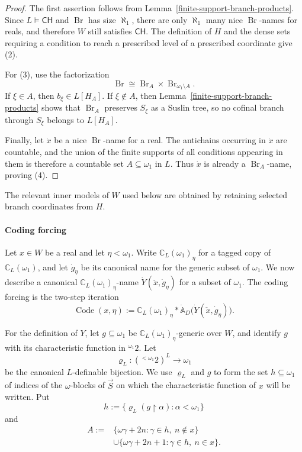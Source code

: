 \documentclass[a4paper,11pt]{article}
\newcommand{\CH}{\mathsf{CH}}
\begin{document}
\begin{proof}
The first assertion follows from Lemma~\ref{finite-support-branch-products}.
Since $L\models\CH$ and $\operatorname{Br}$ has size $\aleph_1$, there are only
$\aleph_1$ many nice $\operatorname{Br}$-names for reals, and therefore $W$
still satisfies $\CH$.  The definition of $H$ and the dense sets requiring a
condition to reach a prescribed level of a prescribed coordinate give (2).

For (3), use the factorization
\[
   \operatorname{Br}\cong
   \operatorname{Br}_A\times\operatorname{Br}_{\omega_1\setminus A}.
\]
If $\xi\in A$, then $b_\xi\in L[H_A]$.  If $\xi\notin A$, then
Lemma~\ref{finite-support-branch-products} shows that
$\operatorname{Br}_A$ preserves $S_\xi$ as a Suslin tree, so no cofinal branch
through $S_\xi$ belongs to $L[H_A]$.

Finally, let $\dot x$ be a nice $\operatorname{Br}$-name for a real.  The
antichains occurring in $\dot x$ are countable, and the union of the finite
supports of all conditions appearing in them is therefore a countable set
$A\subseteq\omega_1$ in $L$.  Thus $\dot x$ is already a
$\operatorname{Br}_A$-name, proving (4).
\end{proof}

The relevant inner models of $W$ used below are obtained by retaining
selected branch coordinates from $H$.

\paragraph{Coding forcing}
Let $x\in W$ be a real and let $\eta<\omega_1$.  Write
$\mathbb C_L(\omega_1)_\eta$ for a tagged copy of
$\mathbb C_L(\omega_1)$, and let $\dot g_\eta$ be its canonical name for the
generic subset of $\omega_1$.  We now describe a canonical
$\mathbb C_L(\omega_1)_\eta$-name
$\dot Y(\check x,\dot g_\eta)$ for a subset of $\omega_1$.  The coding
forcing is the two-step iteration
\[
   \operatorname{Code}(x,\eta)
   :=\mathbb C_L(\omega_1)_\eta
      *\dot{\mathbb A}_D\bigl(\dot Y(\check x,\dot g_\eta)\bigr).
\]

For the definition of $Y$, let $g\subseteq\omega_1$ be
$\mathbb C_L(\omega_1)_\eta$-generic over $W$, and identify $g$ with its
characteristic function in ${}^{\omega_1}2$.  Let
\[
   \varrho_L:({}^{<\omega_1}2)^L\longrightarrow\omega_1
\]
be the canonical $L$-definable bijection.  We use $\varrho_L$ and $g$ to
form the set
$h\subseteq\omega_1$ of indices of the $\omega$-blocks of $\vec S$ on which
the characteristic function of $x$ will be written.  Put
\[
   h:=\{\varrho_L(g\restriction\alpha):\alpha<\omega_1\}
\]
and
\begin{align*}
   A:={}&\{\omega\gamma+2n:\gamma\in h,\ n\notin x\}\\
       &\mathbin{\cup}\{\omega\gamma+2n+1:\gamma\in h,\ n\in x\}.
\end{align*}
\end{document}
